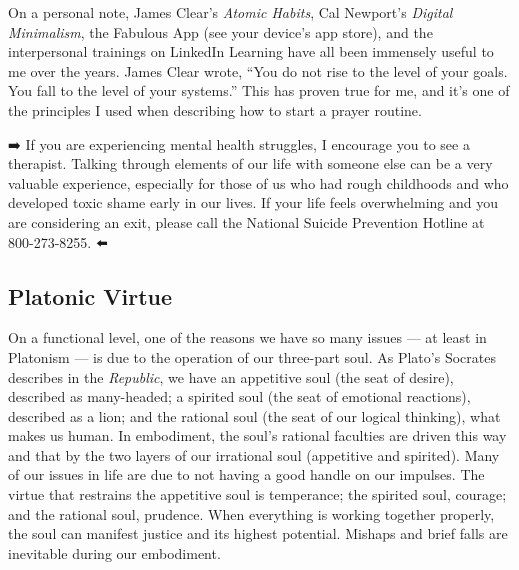 \documentclass[
]{book}
\begin{document}
On a personal note, James Clear's \emph{Atomic Habits}, Cal Newport's \emph{Digital Minimalism}, the Fabulous App (see your device's app store), and the interpersonal trainings on LinkedIn Learning have all been immensely useful to me over the years. James Clear wrote, ``You do not rise to the level of your goals. You fall to the level of your systems.'' This has proven true for me, and it's one of the principles I used when describing how to start a prayer routine.

➡️ If you are experiencing mental health struggles, I encourage you to see a therapist. Talking through elements of our life with someone else can be a very valuable experience, especially for those of us who had rough childhoods and who developed toxic shame early in our lives. If your life feels overwhelming and you are considering an exit, please call the National Suicide Prevention Hotline at 800-273-8255. ⬅️

\hypertarget{platonic-virtue}{%
\subsection{Platonic Virtue}\label{platonic-virtue}}

On a functional level, one of the reasons we have so many issues --- at least in Platonism --- is due to the operation of our three-part soul. As Plato's Socrates describes in the \emph{Republic}, we have an appetitive soul (the seat of desire), described as many-headed; a spirited soul (the seat of emotional reactions), described as a lion; and the rational soul (the seat of our logical thinking), what makes us human. In embodiment, the soul's rational faculties are driven this way and that by the two layers of our irrational soul (appetitive and spirited). Many of our issues in life are due to not having a good handle on our impulses. The virtue that restrains the appetitive soul is temperance; the spirited soul, courage; and the rational soul, prudence. When everything is working together properly, the soul can manifest justice and its highest potential. Mishaps and brief falls are inevitable during our embodiment.
\end{document}

